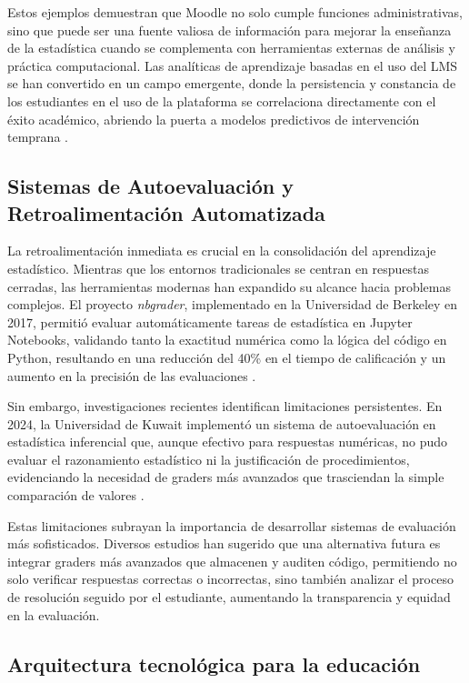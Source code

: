\documentclass[letter,oneside,12pt,spanish]{report}
\begin{document}
Estos ejemplos demuestran que Moodle no solo cumple funciones administrativas, sino que puede ser una fuente valiosa de información para mejorar la enseñanza de la estadística cuando se complementa con herramientas externas de análisis y práctica computacional. Las analíticas de aprendizaje basadas en el uso del LMS se han convertido en un campo emergente, donde la persistencia y constancia de los estudiantes en el uso de la plataforma se correlaciona directamente con el éxito académico, abriendo la puerta a modelos predictivos de intervención temprana \parencite{Goh2025}.

\subsection{Sistemas de Autoevaluación y Retroalimentación Automatizada}
La retroalimentación inmediata es crucial en la consolidación del aprendizaje estadístico. Mientras que los entornos tradicionales se centran en respuestas cerradas, las herramientas modernas han expandido su alcance hacia problemas complejos. El proyecto \textit{nbgrader}, implementado en la Universidad de Berkeley en 2017, permitió evaluar automáticamente tareas de estadística en Jupyter Notebooks, validando tanto la exactitud numérica como la lógica del código en Python, resultando en una reducción del 40\% en el tiempo de calificación y un aumento en la precisión de las evaluaciones \parencite{Blank2017}.

Sin embargo, investigaciones recientes identifican limitaciones persistentes. En 2024, la Universidad de Kuwait implementó un sistema de autoevaluación en estadística inferencial que, aunque efectivo para respuestas numéricas, no pudo evaluar el razonamiento estadístico ni la justificación de procedimientos, evidenciando la necesidad de graders más avanzados que trasciendan la simple comparación de valores \parencite{AlHaddad2024}.

Estas limitaciones subrayan la importancia de desarrollar sistemas de evaluación más sofisticados. Diversos estudios han sugerido que una alternativa futura es integrar graders más avanzados que almacenen y auditen código, permitiendo no solo verificar respuestas correctas o incorrectas, sino también analizar el proceso de resolución seguido por el estudiante, aumentando la transparencia y equidad en la evaluación.


\subsection{Arquitectura tecnológica para la educación}
\end{document}
